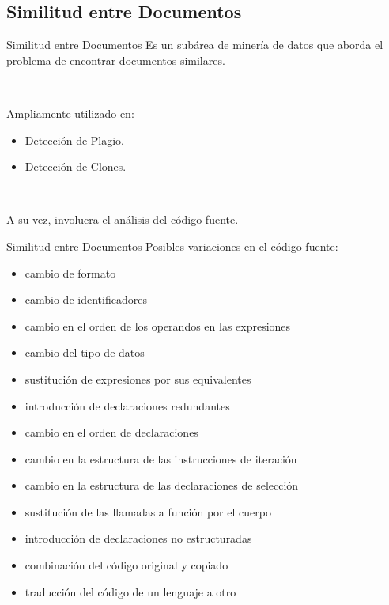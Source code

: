 \documentclass{beamer}
\begin{document}
\subsection{Similitud entre Documentos}
\begin{frame}{Similitud entre Documentos}
Es un subárea de minería de datos que aborda el problema de encontrar
documentos similares.

~

Ampliamente utilizado en:
\begin{itemize}
  \item Detección de Plagio.
  \item Detección de Clones.
\end{itemize}

~

A su vez, involucra el análisis del código fuente.
\end{frame}

\begin{frame}{Similitud entre Documentos}
Posibles variaciones en el código fuente:
\begin{itemize}
  \item cambio de formato
  \item cambio de identificadores
  \item cambio en el orden de los operandos en las expresiones
  \item cambio del tipo de datos
  \item sustitución de expresiones por sus equivalentes
  \item introducción de declaraciones redundantes
  \item cambio en el orden de declaraciones
  \item cambio en la estructura de las instrucciones de iteración
  \item cambio en la estructura de las declaraciones de selección
  \item sustitución de las llamadas a función por el cuerpo
  \item introducción de declaraciones no estructuradas
  \item combinación del código original y copiado
  \item traducción del código de un lenguaje a otro
\end{itemize}
\end{frame}
\end{document}
